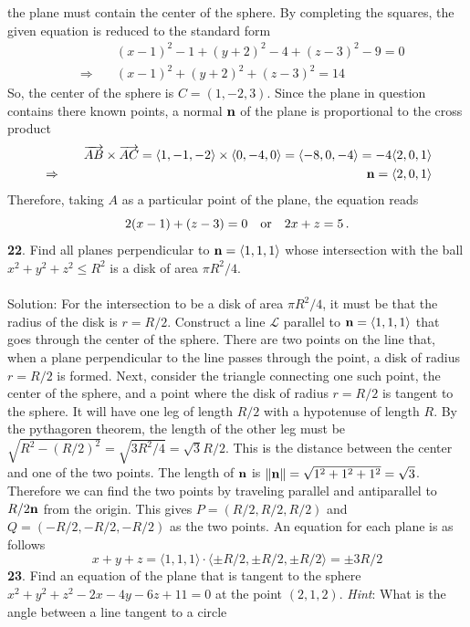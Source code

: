 \documentclass[12pt]{amsbook}
\newcommand{\la}{\langle}
\newcommand{\ra}{\rangle}
\begin{document}
the plane must contain the center of the sphere.
By completing the squares, the given equation is reduced to the standard
form
\begin{eqnarray*}
&&\quad (x-1)^2-1+(y+2)^2-4+(z-3)^2-9=0\\
&\Rightarrow&\quad
(x-1)^2+(y+2)^2+(z-3)^2=14
\end{eqnarray*}
So, the center of the sphere is $C=(1,-2,3)$. Since the plane in question 
contains there known points, a normal ${\bf n}$ of the plane is proportional to the cross product 
\begin{eqnarray*}
&&\quad \overrightarrow{AB}\times\overrightarrow{AC}=
\langle 1,-1,-2\rangle\times\langle 0,-4,0\rangle
=\langle -8,0,-4\rangle =-4\langle 2,0,1\rangle\\
&\Rightarrow&\quad {\bf n}=\langle 2,0,1\rangle
\end{eqnarray*}
Therefore, taking $A$ as a particular point of the plane, the equation 
reads
$$
2(x-1)+(z-3)=0\quad {\rm or}\quad 2x+z=5\,.
$$
{\small\bf 22}. Find all planes perpendicular to 
${\bf n}=\la 1,1,1\ra$ whose intersection with 
the ball $x^2+y^2+z^2\leq R^2$ is a disk of area $\pi R^2/4$.\\
\\
{\sc Solution}: For the intersection to be a disk of area $\pi R^2/4$, it must be that the radius of the disk is $r=R/2$. Construct a line $\mathcal{L}$ parallel to ${\bf n}=\la 1,1,1\ra$ that goes through the center of the sphere. There are two points on the line that, when a plane perpendicular to the line passes through the point, a disk of radius $r=R/2$ is formed. Next, consider the triangle connecting one such point, the center of the sphere, and a point where the disk of radius $r=R/2$ is tangent to the sphere. It will have one leg of length $R/2$ with a hypotenuse of length $R$. By the pythagoren theorem, the length of the other leg must be $\sqrt{R^2-(R/2)^2}=\sqrt{3R^2/4}=\sqrt{3}R/2$. This is the distance between the center and one of the two points. The length of $\bf n$ is $\|{\bf n}\|=\sqrt{1^2+1^2+1^2}=\sqrt{3}$. Therefore we can find the two points by traveling parallel and antiparallel to $R/2{\bf n}$ from the origin. This gives $P=(R/2,R/2,R/2)$ and $Q=(-R/2,-R/2,-R/2)$ as the two points. An equation for each plane is as follows
$$x+y+z=\la 1,1,1\ra\cdot \la \pm R/2, \pm R/2, \pm R/2 \ra=\pm 3R/2$$ 
{\small\bf 23}. Find an equation of the plane 
that is tangent to the sphere $x^2+y^2+z^2-2x-4y-6z+11=0$
at the point $(2,1,2)$. {\it Hint}:
What is the angle between a line tangent to a circle 
\end{document}
